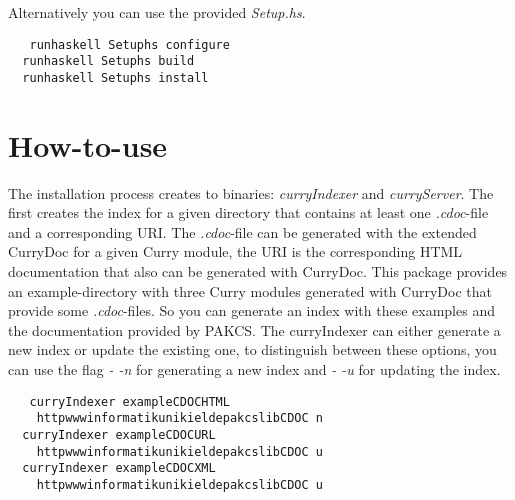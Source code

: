 \documentclass[%
	pdftex,%
	a4paper,%
	oneside,%
	chapterprefix,%
	headsepline,%
	12pt%
]{scrbook}
\begin{document}
Alternatively you can use the provided \emph{Setup.hs}.
\begin{tabbing}\tt
~~runhaskell~Setuphs~configure\\
\tt ~~runhaskell~Setuphs~build\\
\tt ~~runhaskell~Setuphs~install
\end{tabbing}

\section{How-to-use}

The installation process creates to binaries: \emph{curryIndexer} and
\emph{curryServer}. %
The first creates the index for a given directory that contains at
least one \emph{.cdoc}-file and a corresponding URI. %
The \emph{.cdoc}-file can be generated with the extended CurryDoc for
a given Curry module, the URI is the corresponding HTML documentation
that also can be generated with CurryDoc. %
This package provides an example-directory with three Curry modules
generated with CurryDoc that provide some \emph{.cdoc}-files. %
So you can generate an index with these examples and the documentation
provided by PAKCS. %
The curryIndexer can either generate a new index or update the
existing one, to distinguish between these options, you can use the
flag \emph{- -n} for generating a new index and \emph{- -u} for
updating the index.

\begin{tabbing}\tt
~~curryIndexer~exampleCDOCHTML~\\
\tt ~~~~httpwwwinformatikunikieldepakcslibCDOC~n\\
\tt ~~curryIndexer~exampleCDOCURL~\\
\tt ~~~~httpwwwinformatikunikieldepakcslibCDOC~u\\
\tt ~~curryIndexer~exampleCDOCXML~\\
\tt ~~~~httpwwwinformatikunikieldepakcslibCDOC~u
\end{tabbing}
\end{document}
